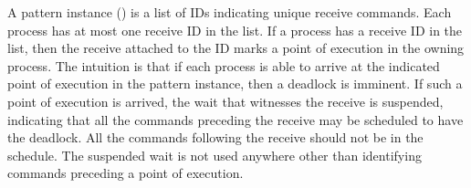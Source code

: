 A pattern instance (\rcvp) is a list of IDs indicating unique receive commands. Each process has at most one
receive ID in the list. If a process has a receive ID in the list, then the receive attached to the ID marks a point of execution in
the owning process. The intuition is that if each process is able to
arrive at the indicated point of execution in the pattern instance, then a deadlock is imminent. If such a point of execution is arrived, the wait that witnesses the receive is suspended, indicating that all the commands preceding the receive may be scheduled to have the deadlock. All the commands following the receive should not be in the schedule. The suspended wait is not used anywhere other than identifying commands preceding a point of execution.








\newsavebox{\boxLangSyntax}

\begin{lrbox}{\boxLangSyntax}
\begin{minipage}[c]{0.3\linewidth}
\cfgstart
{}
\cfgrule{\thread}{\lp\cfgnt{\cmd}~$\ldots$~$\bot$\rp}
\cfgrule{\cmd}{\lp\cfgt{\sendi}~\cfgt{\aid}~\cfgt{\num}~\cfgt{\num}\rp}
   \cfgorline{\lp\cfgt{\recvi}~\cfgt{\aid}~\cfgt{\num}~\cfgt{\num}~\cfgt{\aid}\rp}
   \cfgorline{\lp\cfgt{\wait}~\cfgt{\aid}\rp}
   \cfgorline{\lp\cfgt{$\ast$\wait}~\cfgt{\aid}\rp}
   \cfgorline{\lp\cfgt{\barrier}~\cfgt{\aid}\rp}
   \cfgorline{\lp\cfgt{$\ast$\barrier}~\cfgt{\aid}\rp}
\
    \cfgorline{\cfgt{$\ast$}}
\cfgrule{\rcvp}{\lp\aid~$\ldots$\rp}
\cfgend
\end{minipage}
\end{lrbox}


\newsavebox{\boxEvalSyntax}
\begin{lrbox}{\boxEvalSyntax}
\begin{minipage}[c]{0.3\linewidth}
\cfgstart
{}
\cfgrule{\epsnd}{\cfgt{\mt}\
   \cfgor\lp\cfgnt{\epsnd}~\lb\lp\cfgt{\num}\ \cfgt{\num}\rp~$\rightarrow$~\cfgt{\num}\rb\rp}
\cfgrule{\eprcv}{\cfgt{\mt}\
   \cfgor\lp\cfgnt{\eprcv}~\lb\lp\cfgt{\num}\ \cfgt{\num}\rp~$\rightarrow$~\cfgt{\num}\rb\rp}
\cfgrule{\epbarrier}{\cfgt{\mt}\
   \cfgor\lp\cfgnt{\epbarrier}~\lb\cfgnt{\aid}~$\rightarrow$~\cfgt{\num}\rb\rp}
\cfgend
\end{minipage}
\end{lrbox}

